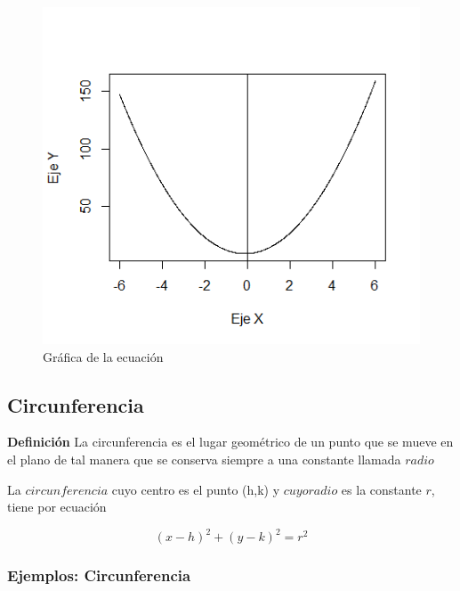 \documentclass[12pt,a4paper]{article} %
\begin{document}
\begin{figure}[ht]
\centering
\includegraphics[scale=0.8]{Parabola2}
\caption{Gráfica de la ecuación }
\label{fig:Parabola2}
\end{figure}


\newpage

\subsection{Circunferencia} \label{subsec:circunferencia}
\textbf{Definición} La circunferencia es el lugar geométrico de un punto que se mueve en el plano de tal manera que se conserva siempre a una constante llamada $radio$

La $circunferencia$ cuyo centro es el punto (h,k) y $cuyo radio$ es la constante $r$, tiene por ecuación

$${(x - h)^2 + (y - k)^2 = r^2}$$

\subsubsection{Ejemplos: Circunferencia}
\end{document}
